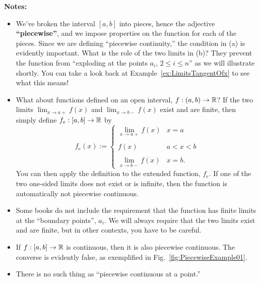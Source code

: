 \begin{tcolorbox}[colback=mylightblue, title = {\bf Piecewise Continuity}, breakable]
\begin{definition}
\end{definition}
\textbf{Notes:}
\begin{itemize}
    \item We've broken the interval $[a, b]$ into pieces, hence the adjective \textbf{``piecewise''}, and we impose properties on the function for each of the pieces. Since we are defining ``piecewise continuity,'' the condition in (a) is evidently important. What is the role of the two limits in (b)? They prevent the function from ``exploding at the points $a_i$, $2\le i \le n$'' as we will illustrate shortly. You can take a look back at Example~\ref{ex:LimitsTangentOfx} to see what this means! 
    \item What about functions defined on an open interval, $f:(a, b) \to \mathbb R$? If the two limits $ \displaystyle \lim_{x \to a+} f(x) $ and $\displaystyle \lim_{x \to b-} f(x) $ exist and are finite, then simply define $f_e :[a, b] \to \mathbb R$ by
    $$ f_e(x):= \begin{cases}
         \displaystyle \lim_{x \to a+} f(x) & x = a \\
         \\
          f(x) & a < x < b \\
          \\
         \displaystyle \lim_{x \to b-} f(x) & x = b.
    \end{cases}$$
    You can then apply the definition to the extended function, $f_e$. If one of the two one-sided limits does not exist or is infinite, then the function is automatically not piecewise continuous. 
    \item Some books do not include the requirement that the function has finite limits at the ``boundary points'', $a_i$. We will always require that the two limits exist and are finite, but in other contexts, you have to be careful. 
    \item If $f:[a, b] \to  \mathbb R$ is continuous, then it is also piecewise continuous. The converse is evidently false, as exemplified in Fig.~\ref{fig:PiecewiseExample01}.
    \item There is no such thing as ``piecewise continuous at a point.''
    
\end{itemize}
\end{tcolorbox}

\clearpage

